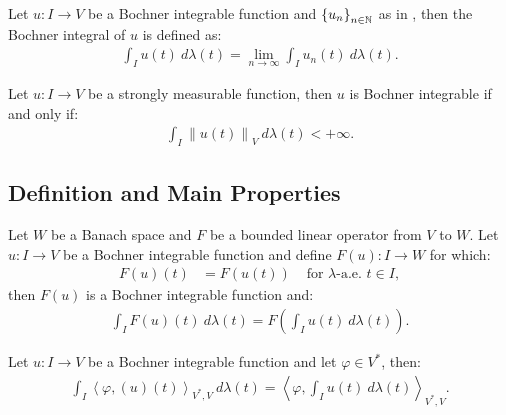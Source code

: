 \begin{definition}
    Let $u\colon I \rightarrow V$ be a Bochner integrable function and $\left\{ u_n \right\}_{n \in \mathbb{N}}$ as in , then the Bochner integral of $u$ is defined as:
    \begin{align}
        \int_I u(t) ~ d \lambda(t) = \lim_{n \rightarrow \infty} \int_I u_n(t) ~ d \lambda(t).
    \end{align}
\end{definition}

\begin{theorem}[Bochner]
    Let $u\colon I \rightarrow V$ be a strongly measurable function, then $u$ is Bochner integrable if and only if:
    \begin{align}
        \int_I \left\lVert u(t) \right\rVert_V ~ d \lambda(t) < + \infty.
    \end{align}
\end{theorem}

\newpage
\subsection{Definition and Main Properties}

\begin{corollary}
    Let $W$ be a Banach space and $F$ be a bounded linear operator from $V$ to $W$. Let $u\colon I \rightarrow V$ be a Bochner integrable function and define $F(u) \colon I \rightarrow W$ for which:
    \begin{align}
        F(u)(t) &= F(u(t)) &\text{ for } \lambda \text{-a.e. } t \in I,
    \end{align}
    then $F(u)$ is a Bochner integrable function and:
    \begin{align}
        \int_I F(u)(t) ~ d \lambda(t) = F\left( \int_I u(t) ~ d \lambda(t) \right).
    \end{align}
\end{corollary}

\begin{remark} %
    Let $u\colon I \rightarrow V$ be a Bochner integrable function and let $\varphi \in V^*$, then:
    \begin{align}
        \int_I \left\langle \varphi, (u)(t) \right\rangle_{V^*, V} ~ d \lambda(t) = \left\langle \varphi, \int_I u(t) ~ d \lambda(t) \right\rangle_{V^*, V}.
    \end{align}
\end{remark}

